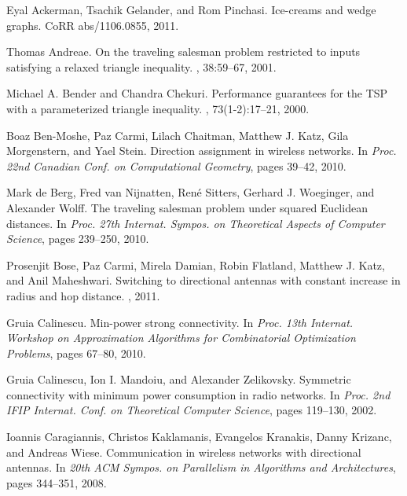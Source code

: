 \documentclass[11pt,letter]{article}
\begin{document}
\begin{thebibliography}{1}

Eyal Ackerman, Tsachik Gelander, and Rom Pinchasi.
\newblock Ice-creams and wedge graphs.
\newblock CoRR abs/1106.0855, 2011.

Thomas Andreae.
\newblock On the traveling salesman problem restricted to inputs satisfying a relaxed triangle inequality.
, 38:59--67, 2001.

Michael A. Bender and Chandra Chekuri.
\newblock Performance guarantees for the TSP with a parameterized triangle inequality.
, 73(1-2):17--21, 2000.

Boaz Ben-Moshe, Paz Carmi, Lilach Chaitman, Matthew J. Katz, Gila Morgenstern, and Yael Stein.
\newblock Direction assignment in wireless networks.
\newblock In {\em Proc. 22nd Canadian Conf. on Computational Geometry}, pages 39--42, 2010.

Mark de Berg, Fred van Nijnatten, Ren{\'e} Sitters, Gerhard J. Woeginger, and Alexander Wolff.
\newblock The traveling salesman problem under squared Euclidean distances.
\newblock In {\em Proc. 27th Internat. Sympos. on Theoretical Aspects of Computer Science}, pages 239--250, 2010.



Prosenjit Bose, Paz Carmi, Mirela Damian, Robin Flatland, Matthew J. Katz, and Anil Maheshwari.
\newblock Switching to directional antennas with constant increase in radius and hop distance.
, 2011.





Gruia Calinescu.
\newblock Min-power strong connectivity.
\newblock In {\em Proc. 13th Internat. Workshop on Approximation Algorithms for Combinatorial Optimization Problems},
pages 67--80, 2010.

Gruia Calinescu, Ion I. Mandoiu, and Alexander Zelikovsky.
\newblock Symmetric connectivity with minimum power consumption in radio networks.
\newblock In {\em Proc. 2nd IFIP Internat. Conf. on Theoretical Computer Science}, pages 119--130, 2002.

Ioannis Caragiannis, Christos Kaklamanis, Evangelos Kranakis, Danny Krizanc, and Andreas Wiese.
\newblock Communication in wireless networks with directional antennas.
\newblock In {\em 20th ACM Sympos. on Parallelism in Algorithms and Architectures}, pages 344--351, 2008.


\end{thebibliography}
\end{document}
